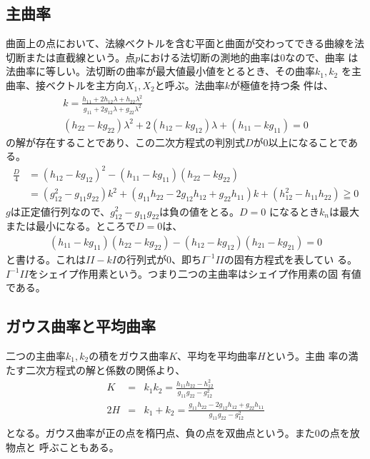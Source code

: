         \subsection{主曲率}
            曲面上の点において、法線ベクトルを含む平面と曲面が交わってできる曲線を法
            切断または直截線という。点$p$における法切断の測地的曲率は0なので、曲率
            は法曲率に等しい。法切断の曲率が最大値最小値をとるとき、その曲率$k_1,k_2$
            を主曲率、接ベクトルを主方向$X_1,X_2$と呼ぶ。法曲率$k$が極値を持つ条
            件は、
            \begin{gather*}
                k = \frac{h_{11}+2h_{12}\lambda+h_{22}\lambda^2}
                {g_{11}+2g_{12}\lambda+g_{22}\lambda^2}\\
                (h_{22}-kg_{22})\lambda^2
                + 2(h_{12}-kg_{12})\lambda
                + (h_{11}-kg_{11}) = 0
            \end{gather*}
            の解が存在することであり、この二次方程式の判別式$D$が0以上になることである。
            \begin{align*}
                \frac{D}{4} &= (h_{12}-kg_{12})^2 - (h_{11}-kg_{11})(h_{22}-kg_{22})\\
                &= (g_{12}^2-g_{11}g_{22})k^2
                + (g_{11}h_{22}-2g_{12}h_{12}+g_{22}h_{11})k
                + (h_{12}^2-h_{11}h_{22}) \geqq 0
            \end{align*}
            $g$は正定値行列なので、$g_{12}^2-g_{11}g_{22}$は負の値をとる。$D=0$
            になるとき$k_n$は最大または最小になる。ところで$D=0$は、
            \begin{align*}
                (h_{11}-kg_{11})(h_{22}-kg_{22})
                -(h_{12}-kg_{12})(h_{21}-kg_{21}) = 0
            \end{align*}
            と書ける。これは$II-kI$の行列式が0、即ち$I^{-1}II$の固有方程式を表してい
            る。$I^{-1}II$をシェイプ作用素という。つまり二つの主曲率はシェイプ作用素の固
            有値である。


        \subsection{ガウス曲率と平均曲率}
            二つの主曲率$k_1,k_2$の積をガウス曲率$K$、平均を平均曲率$H$という。主曲
            率の満たす二次方程式の解と係数の関係より、
            \begin{eqnarray*}
                K &=& k_1k_2 = \frac{h_{11}h_{22}-h_{12}^2}{g_{11}g_{22}-g_{12}^2}\\
                2H &=& k_1+k_2 = \frac{g_{11}h_{22}-2g_{12}h_{12}+g_{22}h_{11}}
                {g_{11}g_{22}-g_{12}^2}\\
            \end{eqnarray*}
            となる。ガウス曲率が正の点を楕円点、負の点を双曲点という。また0の点を放物点と
            呼ぶこともある。


